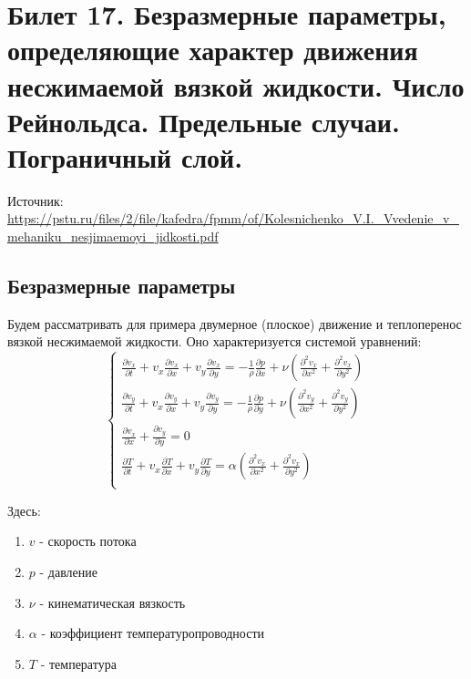 \newpage
\section{Билет 17. Безразмерные параметры, определяющие характер движения несжимаемой вязкой жидкости. Число Рейнольдса. Предельные случаи. Пограничный слой.}

Источник: \url{https://pstu.ru/files/2/file/kafedra/fpmm/of/Kolesnichenko_V.I._Vvedenie_v_mehaniku_nesjimaemoyi_jidkosti.pdf}

\subsection{Безразмерные параметры}
Будем рассматривать для примера двумерное (плоское) движение и теплоперенос вязкой несжимаемой жидкости. Оно характеризуется системой уравнений:
\begin{equation}
  \begin{cases}
    \frac{\partial v_x}{\partial t} + v_x\frac{\partial v_x}{\partial x} + v_y\frac{\partial v_x}{\partial y} = -\frac{1}{\rho} \frac{\partial p}{\partial x} + \nu (\frac{\partial^2 v_x}{\partial x^2} + \frac{\partial^2 v_x}{\partial y^2}) \\

    \frac{\partial v_y}{\partial t} + v_x\frac{\partial v_y}{\partial x} + v_y\frac{\partial v_y}{\partial y} = -\frac{1}{\rho} \frac{\partial p}{\partial y} + \nu (\frac{\partial^2 v_y}{\partial x^2} + \frac{\partial^2 v_y}{\partial y^2}) \\

    \frac{\partial v_x}{\partial x} + \frac{\partial v_y}{\partial y} = 0                                                                                                                                                                       \\

    \frac{\partial T}{\partial t} + v_x\frac{\partial T}{\partial x} + v_y\frac{\partial T}{\partial y} = \alpha(\frac{\partial^2 v_x}{\partial x^2} + \frac{\partial^2 v_x}{\partial y^2})                                                     \\
  \end{cases}
\end{equation}

Здесь:
\begin{enumerate}
  \item[\textbullet] $v$ - скорость потока
  \item[\textbullet] $p$ - давление
  \item[\textbullet] $\nu$ - кинематическая вязкость
  \item[\textbullet] $\alpha$ - коэффициент температуропроводности
  \item[\textbullet] $T$ - температура
\end{enumerate}

